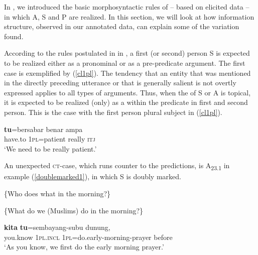 \documentclass[output=paper
,modfonts
,nonflat]{langsci/langscibook}
\begin{document}
In , we introduced the basic morphosyntactic rules of  -- based on elicited data -- in which A, S and P are realized. In this section, we will look at how information structure, observed in our annotated data, can explain some of the variation found.

According to the rules postulated in  in , a first (or second) person S is expected to be realized either as a pronominal  or as a pre-predicate argument. The first case is exemplified by (\ref{cl1pl}). The tendency that an entity that was mentioned in the directly preceding utterance or that is generally salient is not overtly expressed applies to all types of arguments. Thus, when the  of 
S or A is topical, it is expected to be realized (only) as a  within the predicate in first and second person. This is the case with the first person plural subject in (\ref{cl1pl}).

\begin{exe}
	\ex\label{cl1pl}
	\begin{xlist}
	\end{xlist}
	\begin{xlist}[> A\textsubscript{{33''}}:]
		\exi{> A\textsubscript{{33''}}:}
		 {{\ob}\textbf{tu}=bersabar} {benar{\cb}\focus{\cb}\sq} {{\ob}ampa{\cb}\nai}\\
		\hphantom{[}have.to \hphantom{[}\textsc{1pl}=patient \hphantom{[}really \textsc{itj}\\
		\glt `We need to be really patient.'\\
	\end{xlist}
\end{exe}

\noindent An unexpected \textsc{ct}-case, which runs counter to the predictions, is A\textsubscript{{23.1}} in example (\ref{doublemarked1}), in which S is doubly marked. 

\begin{exe}
	\ex\label{doublemarked1}
	\begin{xlist}
		 \{Who does what in the morning?\}
	\end{xlist}
	\begin{xlist}
		 \{What do we (Muslims) do in the morning?\}
	\end{xlist}
	\begin{xlist}[≫ A\textsubscript{{23.1}}:]
		\exi{≫ A\textsubscript{{23.1}}:}
		 {{\ob}{\ob}\textbf{kita}{\cb}\ctopic} {{\ob}\textbf{tu}=sembayang-subu{\cb}\focus} {{\ob}dunung,{\cb}\topic{\cb}\sq}\\
		\hphantom{[}you.know \hphantom{[[}\textsc{1pl.incl} \hphantom{[}\textsc{1pl}=do.early-morning-prayer \hphantom{[}before\\
		\glt `As you know, we first do the early morning prayer.'
	\end{xlist}
\end{exe}
\end{document}
